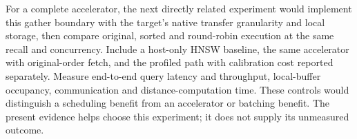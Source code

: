 For a complete accelerator, the next directly related experiment would implement this gather boundary with the target's native transfer granularity and local storage, then compare original, sorted and round-robin execution at the same recall and concurrency. Include a host-only HNSW baseline, the same accelerator with original-order fetch, and the profiled path with calibration cost reported separately. Measure end-to-end query latency and throughput, local-buffer occupancy, communication and distance-computation time. These controls would distinguish a scheduling benefit from an accelerator or batching benefit. The present evidence helps choose this experiment; it does not supply its unmeasured outcome.
